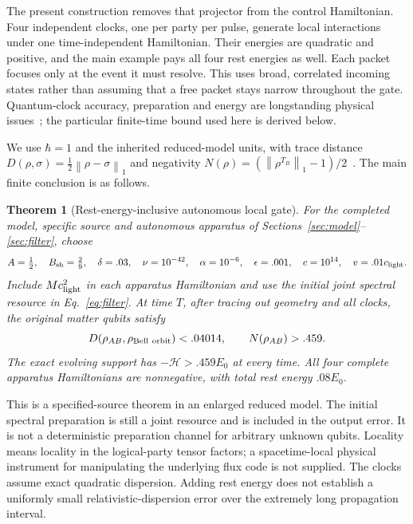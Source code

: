 \documentclass[11pt]{article}
\newtheorem{theorem}{Theorem}
\newcommand{\Hil}{\mathcal H}
\newcommand{\norm}[1]{\left\lVert#1\right\rVert}
\begin{document}
The present construction removes that projector from the control Hamiltonian.
Four independent clocks, one per party per pulse, generate local interactions under one time-independent Hamiltonian.
Their energies are quadratic and positive, and the main example pays all four rest energies as well.
Each packet focuses only at the event it must resolve.
This uses broad, correlated incoming states rather than assuming that a free packet stays narrow throughout the gate.
Quantum-clock accuracy, preparation and energy are longstanding physical issues~\cite{SaleckerWigner1958}; the particular finite-time bound used here is derived below.

We use $\hbar=1$ and the inherited reduced-model units, with trace distance $D(\rho,\sigma)=\frac12\norm{\rho-\sigma}_1$ and negativity $N(\rho)=(\norm{\rho^{T_B}}_1-1)/2$~\cite{VidalWerner2002}.
The main finite conclusion is as follows.

\begin{theorem}[Rest-energy-inclusive autonomous local gate]\label{thm:main}
For the completed model, specific source and autonomous apparatus of Sections~\ref{sec:model}--\ref{sec:filter}, choose
\[
 A=\tfrac12,\quad B_{\rm sh}=\tfrac29,\quad\delta=.03,\quad
 \nu=10^{-42},\quad\alpha=10^{-6},\quad
 \epsilon=.001,\quad c=10^{14},\quad v=.01c_{\rm light}.
\]
Include $Mc_{\rm light}^2$ in each apparatus Hamiltonian and use the initial joint spectral resource in Eq.~\eqref{eq:filter}.
At time $T$, after tracing out geometry and all clocks, the original matter qubits satisfy
\begin{equation}
 D(\rho_{AB},\rho_{\rm Bell\ orbit})<.04014,
 \qquad N(\rho_{AB})>.459.\label{eq:mainclaim}
\end{equation}
The exact evolving support has $-\Hil>.459E_0$ at every time.
All four complete apparatus Hamiltonians are nonnegative, with total rest energy $.08E_0$.
\end{theorem}

This is a specified-source theorem in an enlarged reduced model.
The initial spectral preparation is still a joint resource and is included in the output error.
It is not a deterministic preparation channel for arbitrary unknown qubits.
Locality means locality in the logical-party tensor factors; a spacetime-local physical instrument for manipulating the underlying flux code is not supplied.
The clocks assume exact quadratic dispersion.
Adding rest energy does not establish a uniformly small relativistic-dispersion error over the extremely long propagation interval.
\end{document}
